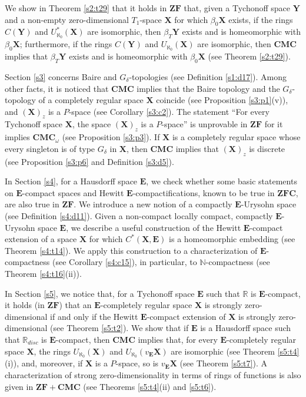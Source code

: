 \documentclass[12pt,twoside,leqno]{article}
\theoremstyle{plain}
\theoremstyle{definition}
\theoremstyle{remark}
\begin{document}
We show in Theorem \ref{s2:t29} that it holds in $\mathbf{ZF}$ that, given a Tychonoff space $\mathbf{Y}$ and a non-empty zero-dimensional $T_1$-space $\mathbf{X}$ for which $\beta_0\mathbf{X}$ exists, if the rings $C(\mathbf{Y})$ and  $U_{\aleph_0}^{\ast}(\mathbf{X})$ are isomorphic, then $\beta_T\mathbf{Y}$ exists and is homeomorphic with $\beta_0\mathbf{X}$; furthermore, if the rings $C(\mathbf{Y})$ and $U_{\aleph_0}(\mathbf{X})$ are isomorphic, then $\mathbf{CMC}$ implies that $\beta_T\mathbf{Y}$ exists and is homeomorphic with $\beta_0\mathbf{X}$ (see Theorem \ref{s2:t29}).

Section \ref{s3} concerns Baire and $G_{\delta}$-topologies (see Definition \ref{s1:d17}). Among other facts, it is noticed that $\mathbf{CMC}$ implies that the Baire topology and the $G_{\delta}$-topology of a completely regular space $\mathbf{X}$ coincide (see Proposition \ref{s3:p1}(v)), and $(\mathbf{X})_z$ is a $P$-space (see Corollary \ref{s3:c2}). The statement ``For every Tychonoff space $\mathbf{X}$, the space $(\mathbf{X})_z$ is a $P$-space'' is unprovable in $\mathbf{ZF}$ for it implies $\mathbf{CMC}_{\omega}$ (see Proposition \ref{s3:p3}). If $\mathbf{X}$ is a completely regular space whose every singleton is of type $G_{\delta}$ in $\mathbf{X}$, then $\mathbf{CMC}$ implies that $(\mathbf{X})_z$ is discrete (see Proposition \ref{s3:p6} and Definition \ref{s3:d5}).

In Section \ref{s4}, for a Hausdorff space $\mathbf{E}$, we check whether some basic statements on $\mathbf{E}$-compact spaces and Hewitt $\mathbf{E}$-compactifications, known to be true in $\mathbf{ZFC}$,  are also true in $\mathbf{ZF}$. We introduce a new notion of a compactly $\mathbf{E}$-Urysohn space (see Definition \ref{s4:d11}). Given a non-compact locally compact, compactly $\mathbf{E}$-Urysohn space $\mathbf{E}$, we describe a useful construction of the Hewitt $\mathbf{E}$-compact extension of a space $\mathbf{X}$ for which $C^{\ast}(\mathbf{X}, \mathbf{E})$ is a homeomorphic embedding (see Theorem \ref{s4:t14}). We apply this construction to a characterization of $\mathbf{E}$-compactness (see Corollary \ref{s4:c15}), in particular, to  $\mathbb{N}$-compactness (see Theorem \ref{s4:t16}(ii)).

In Section \ref{s5}, we notice that, for a Tychonoff space $\mathbf{E}$ such that $\mathbb{R}$ is $\mathbf{E}$-compact, it holds (in $\mathbf{ZF}$) that an $\mathbf{E}$-completely regular space $\mathbf{X}$ is strongly zero-dimensional if and only if the Hewitt $\mathbf{E}$-compact extension of $\mathbf{X}$ is strongly zero-dimensional (see Theorem \ref{s5:t2}). We show that if $\mathbf{E}$ is a Hausdorff space such that $\mathbb{R}_{disc}$ is $\mathbf{E}$-compact, then $\mathbf{CMC}$ implies that, for every $\mathbf{E}$-completely regular space $\mathbf{X}$, the rings $U_{\aleph_0}(\mathbf{X})$ and $U_{\aleph_0}(v_{\mathbf{E}}\mathbf{X})$ are isomorphic (see Theorem \ref{s5:t4}(i)), and, moreover, if $\mathbf{X}$ is a $P$-space, so is $v_{\mathbf{E}}\mathbf{X}$ (see Theorem \ref{s5:t7}). A characterization of strong zero-dimensionality in terms of rings of functions is also given in $\mathbf{ZF+CMC}$ (see Theorems \ref{s5:t4}(ii) and \ref{s5:t6}).
\end{document}
